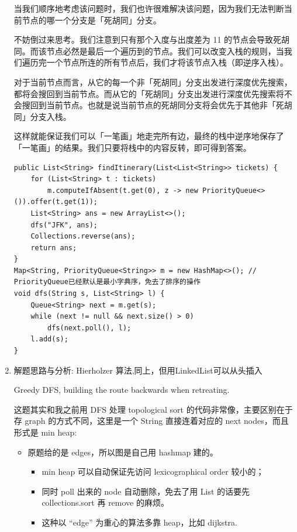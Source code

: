 \documentclass[9pt, b5paaper]{book}
\begin{document}
\begin{enumerate}
当我们顺序地考虑该问题时，我们也许很难解决该问题，因为我们无法判断当前节点的哪一个分支是「死胡同」分支。

不妨倒过来思考。我们注意到只有那个入度与出度差为 11 的节点会导致死胡同。而该节点必然是最后一个遍历到的节点。我们可以改变入栈的规则，当我们遍历完一个节点所连的所有节点后，我们才将该节点入栈（即逆序入栈）。

对于当前节点而言，从它的每一个非「死胡同」分支出发进行深度优先搜索，都将会搜回到当前节点。而从它的「死胡同」分支出发进行深度优先搜索将不会搜回到当前节点。也就是说当前节点的死胡同分支将会优先于其他非「死胡同」分支入栈。

这样就能保证我们可以「一笔画」地走完所有边，最终的栈中逆序地保存了「一笔画」的结果。我们只要将栈中的内容反转，即可得到答案。

\begin{verbatim}
public List<String> findItinerary(List<List<String>> tickets) {
    for (List<String> t : tickets) 
        m.computeIfAbsent(t.get(0), z -> new PriorityQueue<>()).offer(t.get(1));
    List<String> ans = new ArrayList<>();
    dfs("JFK", ans);
    Collections.reverse(ans);
    return ans;
}
Map<String, PriorityQueue<String>> m = new HashMap<>(); // PriorityQueue已经默认是最小字典序，免去了排序的操作
void dfs(String s, List<String> l) {
    Queue<String> next = m.get(s);
    while (next != null && next.size() > 0)
        dfs(next.poll(), l);
    l.add(s);
}
\end{verbatim}
\item 解题思路与分析: Hierholzer 算法,同上，但用LinkedList可以从头插入
\label{sec-1-5-2-3}

Greedy DFS, building the route backwards when retreating.

这题其实和我之前用 DFS 处理 topological sort 的代码非常像，主要区别在于存 graph 的方式不同，这里是一个 String 直接连着对应的 next nodes，而且形式是 min heap:

\begin{itemize}
\item 原题给的是 edges，所以图是自己用 hashmap 建的。
\begin{itemize}
\item min heap 可以自动保证先访问 lexicographical order 较小的；
\item 同时 poll 出来的 node 自动删除，免去了用 List 的话要先 collections.sort 再 remove 的麻烦。
\item 这种以 “edge” 为重心的算法多靠 heap，比如 dijkstra.
\end{itemize}
\end{itemize}


\end{enumerate}
\end{document}
